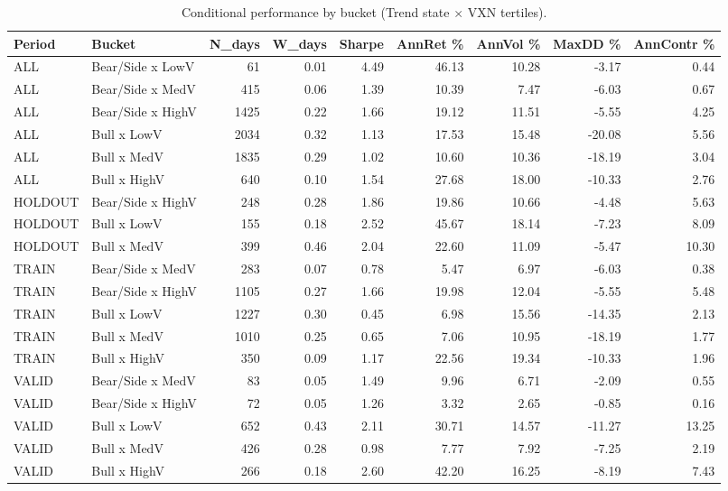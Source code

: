 \begin{table}[t]
\centering
\caption{Conditional performance by bucket (Trend state \(\times\) VXN tertiles).}
\label{tab:bucket_diag}
\begin{tabular}{llrrrrrrr}
\toprule
Period & Bucket & N\_days & W\_days & Sharpe & AnnRet \% & AnnVol \% & MaxDD \% & AnnContr \% \\
\midrule
ALL & Bear/Side x LowV & 61 & 0.01 & 4.49 & 46.13 & 10.28 & -3.17 & 0.44 \\
ALL & Bear/Side x MedV & 415 & 0.06 & 1.39 & 10.39 & 7.47 & -6.03 & 0.67 \\
ALL & Bear/Side x HighV & 1425 & 0.22 & 1.66 & 19.12 & 11.51 & -5.55 & 4.25 \\
ALL & Bull x LowV & 2034 & 0.32 & 1.13 & 17.53 & 15.48 & -20.08 & 5.56 \\
ALL & Bull x MedV & 1835 & 0.29 & 1.02 & 10.60 & 10.36 & -18.19 & 3.04 \\
ALL & Bull x HighV & 640 & 0.10 & 1.54 & 27.68 & 18.00 & -10.33 & 2.76 \\
HOLDOUT & Bear/Side x HighV & 248 & 0.28 & 1.86 & 19.86 & 10.66 & -4.48 & 5.63 \\
HOLDOUT & Bull x LowV & 155 & 0.18 & 2.52 & 45.67 & 18.14 & -7.23 & 8.09 \\
HOLDOUT & Bull x MedV & 399 & 0.46 & 2.04 & 22.60 & 11.09 & -5.47 & 10.30 \\
TRAIN & Bear/Side x MedV & 283 & 0.07 & 0.78 & 5.47 & 6.97 & -6.03 & 0.38 \\
TRAIN & Bear/Side x HighV & 1105 & 0.27 & 1.66 & 19.98 & 12.04 & -5.55 & 5.48 \\
TRAIN & Bull x LowV & 1227 & 0.30 & 0.45 & 6.98 & 15.56 & -14.35 & 2.13 \\
TRAIN & Bull x MedV & 1010 & 0.25 & 0.65 & 7.06 & 10.95 & -18.19 & 1.77 \\
TRAIN & Bull x HighV & 350 & 0.09 & 1.17 & 22.56 & 19.34 & -10.33 & 1.96 \\
VALID & Bear/Side x MedV & 83 & 0.05 & 1.49 & 9.96 & 6.71 & -2.09 & 0.55 \\
VALID & Bear/Side x HighV & 72 & 0.05 & 1.26 & 3.32 & 2.65 & -0.85 & 0.16 \\
VALID & Bull x LowV & 652 & 0.43 & 2.11 & 30.71 & 14.57 & -11.27 & 13.25 \\
VALID & Bull x MedV & 426 & 0.28 & 0.98 & 7.77 & 7.92 & -7.25 & 2.19 \\
VALID & Bull x HighV & 266 & 0.18 & 2.60 & 42.20 & 16.25 & -8.19 & 7.43 \\
\bottomrule
\end{tabular}

\end{table}
